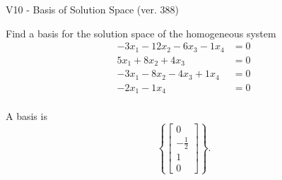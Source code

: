 \begin{exercise}
  \begin{exerciseTitle}V10 - Basis of Solution Space (ver. 388)\end{exerciseTitle}
  \begin{exerciseStatement}
    Find a basis for the solution space of the homogeneous system 
\begin{align*}
 -3 x_ 1 -12 x_ 2 -6 x_ 3 -1 x_ 4 &= 0  \\ 
  5 x_ 1 + 8 x_ 2 + 4 x_ 3 &= 0  \\ 
  -3 x_ 1 -8 x_ 2 -4 x_ 3 + 1 x_ 4 &= 0  \\ 
  -2 x_ 1 -1 x_ 4 &= 0  \\ 
 \end{align*}


 
  \end{exerciseStatement}

  \begin{exerciseAnswer}
   A basis is   
\[\left\{\left[\begin{array}{c}
0 \\
-\frac{1}{2} \\
1 \\
0
\end{array}\right]\right\}.\]

  


  \end{exerciseAnswer}
\end{exercise}